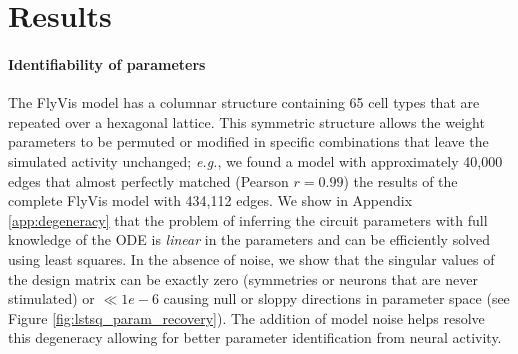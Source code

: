 \documentclass{article}
\def\eg{{\it e.g.}}
\begin{document}
\section{Results}




\paragraph{Identifiability of parameters} 
The FlyVis model has a columnar structure containing 65 cell types that are repeated over a hexagonal lattice. This symmetric structure allows the weight parameters to be permuted or modified in specific combinations that leave the simulated activity unchanged; \eg, we found a model with approximately 40{,}000 edges that almost perfectly matched (Pearson $r = 0.99$) the results of the complete FlyVis model with 434{,}112 edges. We show in Appendix \ref{app:degeneracy} that the problem of inferring the circuit parameters with full knowledge of the ODE is \emph{linear} in the parameters and can be efficiently solved using least squares. In the absence of noise, we show that the singular values of the design matrix can be exactly zero (symmetries or neurons that are never stimulated) or $\ll 1e-6$ causing null or sloppy directions in parameter space (see Figure \ref{fig:lstsq_param_recovery}). The addition of model noise helps resolve this degeneracy allowing for better parameter identification from neural activity.
\end{document}
